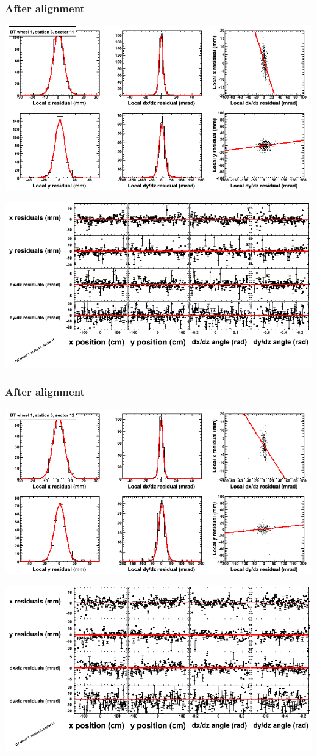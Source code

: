\documentclass[compress]{beamer}
\begin{document}
\begin{frame}
\frametitle{After alignment}
\includegraphics[width=0.7\linewidth]{NOV4_fitfunctions/MBwhDst3sec11_bellcurves.png}

\includegraphics[width=0.7\linewidth]{NOV4_fitfunctions/MBwhDst3sec11_polynomials.png}
\end{frame}

\begin{frame}
\frametitle{After alignment}
\includegraphics[width=0.7\linewidth]{NOV4_fitfunctions/MBwhDst3sec12_bellcurves.png}

\includegraphics[width=0.7\linewidth]{NOV4_fitfunctions/MBwhDst3sec12_polynomials.png}
\end{frame}
\end{document}
